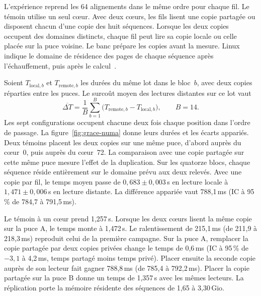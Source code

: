 L’expérience reprend les 64 alignements dans le même ordre pour chaque fil. Le témoin utilise un seul cœur. Avec deux cœurs, les fils lisent une copie partagée ou disposent chacun d’une copie des huit séquences. Lorsque les deux copies occupent des domaines distincts, chaque fil peut lire sa copie locale ou celle placée sur la puce voisine. Le banc prépare les copies avant la mesure. Linux indique le domaine de résidence des pages de chaque séquence après l’échauffement, puis après le calcul~\cite{linuxnuma}.

Soient \(T_{\mathrm{local},b}\) et \(T_{\mathrm{remote},b}\) les durées du même lot dans le bloc~\(b\), avec deux copies réparties entre les puces. Le surcoût moyen des lectures distantes sur ce lot vaut
\[
  \overline{\Delta T}=\frac{1}{B}\sum_{b=1}^{B}
        \bigl(T_{\mathrm{remote},b}-T_{\mathrm{local},b}\bigr),\qquad B=14.
\]
Les sept configurations occupent chacune deux fois chaque position dans l’ordre de passage. La figure~\ref{fig:grace-numa} donne leurs durées et les écarts appariés. Deux témoins placent les deux copies sur une même puce, d’abord auprès du cœur~0, puis auprès du cœur~72. La comparaison avec une copie partagée sur cette même puce mesure l’effet de la duplication.
Sur les quatorze blocs, chaque séquence réside entièrement sur le domaine prévu aux deux relevés. Avec une copie par fil, le temps moyen passe de \(0{,}683\pm0{,}003\)\,s en lecture locale à \(1{,}471\pm0{,}006\)\,s en lecture distante. La différence appariée vaut 788,1\,ms (IC à 95\,\% de 784,7 à 791,5\,ms).

Le témoin à un cœur prend 1,257\,s. Lorsque les deux cœurs lisent la même copie sur la puce A, le temps monte à 1,472\,s. Le ralentissement de 215,1\,ms (de 211,9 à 218,3\,ms) reproduit celui de la première campagne. Sur la puce A, remplacer la copie partagée par deux copies privées change le temps de 0,6\,ms (IC à 95\,\% de \(-3{,}1\) à 4,2\,ms, temps partagé moins temps privé). Placer ensuite la seconde copie auprès de son lecteur fait gagner 788,8\,ms (de 785,4 à 792,2\,ms). Placer la copie partagée sur la puce B donne un temps de 1,357\,s avec les mêmes lecteurs. La réplication porte la mémoire résidente des séquences de 1,65 à 3,30\,Gio.


